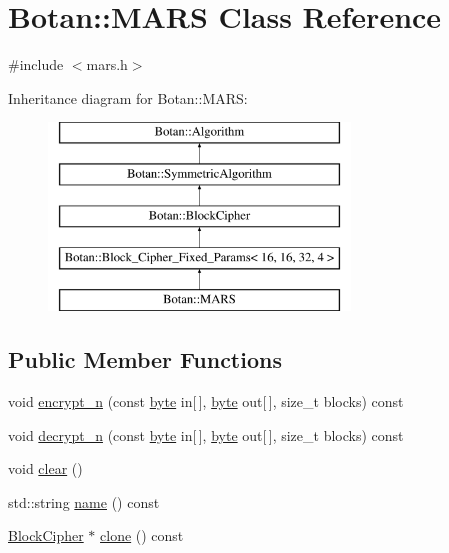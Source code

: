 \hypertarget{classBotan_1_1MARS}{\section{Botan\-:\-:M\-A\-R\-S Class Reference}
\label{classBotan_1_1MARS}
}


{\ttfamily \#include $<$mars.\-h$>$}

Inheritance diagram for Botan\-:\-:M\-A\-R\-S\-:\begin{figure}[H]
\begin{center}
\leavevmode
\includegraphics[height=5.000000cm]{classBotan_1_1MARS}
\end{center}
\end{figure}
\subsection*{Public Member Functions}
\begin{DoxyCompactItemize}
\item 
void \hyperlink{classBotan_1_1MARS_a18a8cf36967c5a2c54f1a7027678d709}{encrypt\-\_\-n} (const \hyperlink{namespaceBotan_a7d793989d801281df48c6b19616b8b84}{byte} in\mbox{[}$\,$\mbox{]}, \hyperlink{namespaceBotan_a7d793989d801281df48c6b19616b8b84}{byte} out\mbox{[}$\,$\mbox{]}, size\-\_\-t blocks) const 
\item 
void \hyperlink{classBotan_1_1MARS_a2ceaa299d4d183cb6d3c3015fda37046}{decrypt\-\_\-n} (const \hyperlink{namespaceBotan_a7d793989d801281df48c6b19616b8b84}{byte} in\mbox{[}$\,$\mbox{]}, \hyperlink{namespaceBotan_a7d793989d801281df48c6b19616b8b84}{byte} out\mbox{[}$\,$\mbox{]}, size\-\_\-t blocks) const 
\item 
void \hyperlink{classBotan_1_1MARS_a7fb99c86e7b16840a258a561fd171e96}{clear} ()
\item 
std\-::string \hyperlink{classBotan_1_1MARS_aadfcae4b9ca472c67fece5d64a968ac0}{name} () const 
\item 
\hyperlink{classBotan_1_1BlockCipher}{Block\-Cipher} $\ast$ \hyperlink{classBotan_1_1MARS_a89fb3a2b5af123d51f7e36070e789cae}{clone} () const 
\end{DoxyCompactItemize}
